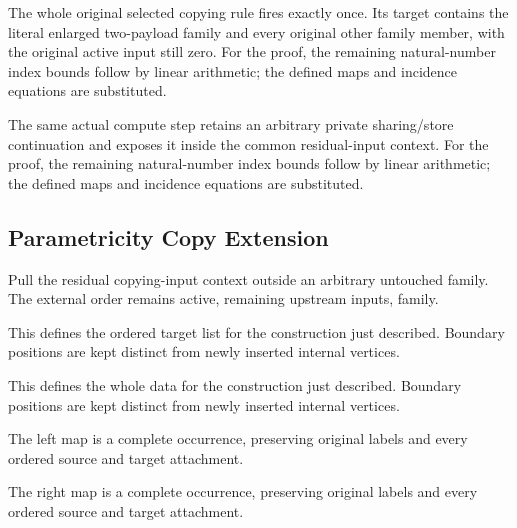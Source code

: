 The whole original selected copying rule fires exactly once. Its target contains the literal enlarged two-payload family and every original other family member, with the original active input still zero.
For the proof, the remaining natural-number index bounds follow by linear arithmetic; the defined maps and incidence equations are substituted.
\par{}

The same actual compute step retains an arbitrary private sharing/store continuation and exposes it inside the common residual-input context.
For the proof, the remaining natural-number index bounds follow by linear arithmetic; the defined maps and incidence equations are substituted.
\par{}

\subsection{Parametricity Copy Extension}
Pull the residual copying-input context outside an arbitrary untouched family. The external order remains active, remaining upstream inputs, family.

This defines the ordered target list for the construction just described. Boundary positions are kept distinct from newly inserted internal vertices.
\par{}

This defines the whole data for the construction just described. Boundary positions are kept distinct from newly inserted internal vertices.
\par{}

The left map is a complete occurrence, preserving original labels and every ordered source and target attachment.
\par{}

The right map is a complete occurrence, preserving original labels and every ordered source and target attachment.
\par{}

